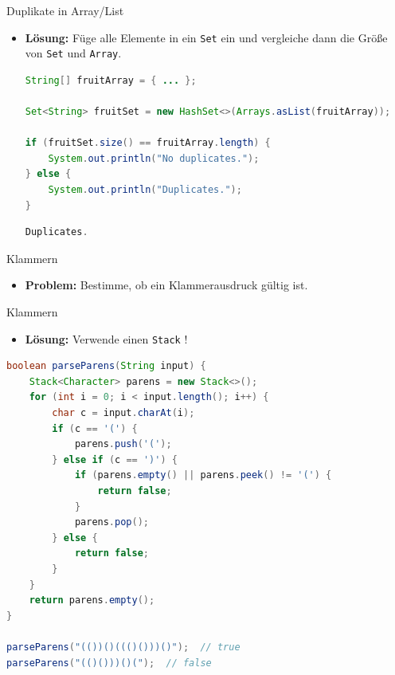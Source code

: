 \documentclass[18pt]{beamer}
\begin{document}
\begin{frame}[fragile]{Duplikate in Array/List}
    \begin{itemize}
        \item \textbf{Lösung:} Füge alle Elemente in ein \texttt{Set} ein und vergleiche dann die Größe von \texttt{Set} und \texttt{Array}.

\vspace{.2in}

        \begin{lstlisting}[language=Java,basicstyle=\scriptsize]
String[] fruitArray = { ... };

Set<String> fruitSet = new HashSet<>(Arrays.asList(fruitArray));

if (fruitSet.size() == fruitArray.length) {
    System.out.println("No duplicates.");
} else {
    System.out.println("Duplicates.");
}
        \end{lstlisting}

\begin{exampleblock}{}
\begin{lstlisting}[language=Java,basicstyle=\scriptsize]
Duplicates.
\end{lstlisting}

\end{exampleblock}


    \end{itemize}
\end{frame}


\begin{frame}[fragile]{Klammern}
    \begin{itemize}
        \item \textbf{Problem:} Bestimme, ob ein Klammerausdruck gültig ist.
    \end{itemize}
\end{frame}

\begin{frame}[fragile]{Klammern}
    \begin{itemize}
        \item \textbf{Lösung:} Verwende einen \texttt{Stack} !
    \end{itemize}

    \begin{lstlisting}[language=Java,basicstyle=\scriptsize]
boolean parseParens(String input) {
    Stack<Character> parens = new Stack<>();
    for (int i = 0; i < input.length(); i++) {
        char c = input.charAt(i);
        if (c == '(') {
            parens.push('(');
        } else if (c == ')') {
            if (parens.empty() || parens.peek() != '(') {
                return false;
            }
            parens.pop();
        } else {
            return false;
        }
    }
    return parens.empty();
}

parseParens("(())()((()()))()");  // true
parseParens("(()()))()(");  // false
    \end{lstlisting}

\end{frame}
\end{document}
